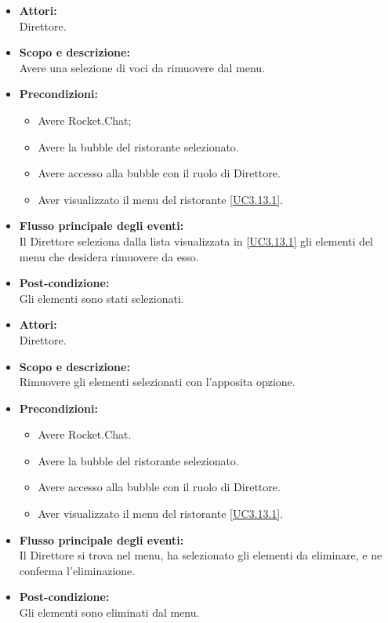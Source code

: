 
\begin{itemize}
	\item \textbf{Attori:}
	\\Direttore.
	\item \textbf{Scopo e descrizione:} 
	\\Avere una selezione di voci da rimuovere dal menu.
	\item \textbf{Precondizioni:}
	\begin{itemize}
		\item Avere Rocket.Chat;
		\item Avere la bubble del ristorante selezionato.
		\item Avere accesso alla bubble con il ruolo di Direttore.
		\item Aver visualizzato il menu del ristorante \ref{UC3.13.1}.
	\end{itemize}
	\item \textbf{Flusso principale degli eventi:}
	\\Il Direttore seleziona dalla lista visualizzata in \ref{UC3.13.1} gli elementi del menu che desidera rimuovere da esso.
	\item \textbf{Post-condizione:}
	\\Gli elementi sono stati selezionati.
\end{itemize}


\begin{itemize}
	\item \textbf{Attori:}
	\\Direttore.
	\item \textbf{Scopo e descrizione:} 
	\\Rimuovere gli elementi selezionati con l'apposita opzione.
	\item \textbf{Precondizioni:}
	\begin{itemize}
		\item Avere Rocket.Chat.
		\item Avere la bubble del ristorante selezionato.
		\item Avere accesso alla bubble con il ruolo di Direttore.
		\item Aver visualizzato il menu del ristorante \ref{UC3.13.1}.
	\end{itemize}
	\item \textbf{Flusso principale degli eventi:}
	\\Il Direttore si trova nel menu, ha selezionato gli elementi da eliminare, e ne conferma l'eliminazione.
	\item \textbf{Post-condizione:}
	\\Gli elementi sono eliminati dal menu.
\end{itemize}

